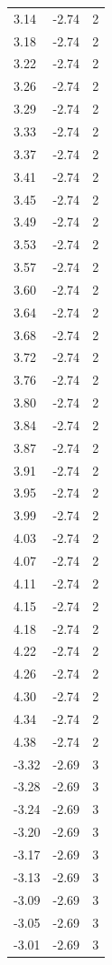 \begin{longtable}{lrr}
  3.14 & -2.74 & 2 \\
  3.18 & -2.74 & 2 \\
  3.22 & -2.74 & 2 \\
  3.26 & -2.74 & 2 \\
  3.29 & -2.74 & 2 \\
  3.33 & -2.74 & 2 \\
  3.37 & -2.74 & 2 \\
  3.41 & -2.74 & 2 \\
  3.45 & -2.74 & 2 \\
  3.49 & -2.74 & 2 \\
  3.53 & -2.74 & 2 \\
  3.57 & -2.74 & 2 \\
  3.60 & -2.74 & 2 \\
  3.64 & -2.74 & 2 \\
  3.68 & -2.74 & 2 \\
  3.72 & -2.74 & 2 \\
  3.76 & -2.74 & 2 \\
  3.80 & -2.74 & 2 \\
  3.84 & -2.74 & 2 \\
  3.87 & -2.74 & 2 \\
  3.91 & -2.74 & 2 \\
  3.95 & -2.74 & 2 \\
  3.99 & -2.74 & 2 \\
  4.03 & -2.74 & 2 \\
  4.07 & -2.74 & 2 \\
  4.11 & -2.74 & 2 \\
  4.15 & -2.74 & 2 \\
  4.18 & -2.74 & 2 \\
  4.22 & -2.74 & 2 \\
  4.26 & -2.74 & 2 \\
  4.30 & -2.74 & 2 \\
  4.34 & -2.74 & 2 \\
  4.38 & -2.74 & 2 \\
  -3.32 & -2.69 & 3 \\
  -3.28 & -2.69 & 3 \\
  -3.24 & -2.69 & 3 \\
  -3.20 & -2.69 & 3 \\
  -3.17 & -2.69 & 3 \\
  -3.13 & -2.69 & 3 \\
  -3.09 & -2.69 & 3 \\
  -3.05 & -2.69 & 3 \\
  -3.01 & -2.69 & 3 \\

\end{longtable}
